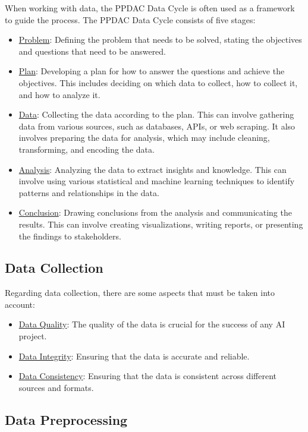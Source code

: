 When working with data, the PPDAC Data Cycle is often used as a framework to guide the process. The PPDAC Data Cycle consists of five stages:
\begin{itemize}
    \item \ul{Problem}: Defining the problem that needs to be solved, stating the objectives and questions that need to be answered.
    \item \ul{Plan}: Developing a plan for how to answer the questions and achieve the objectives. This includes deciding on which data to collect, how to collect it, and how to analyze it.
    \item \ul{Data}: Collecting the data according to the plan. This can involve gathering data from various sources, such as databases, APIs, or web scraping. It also involves preparing the data for analysis, which may include cleaning, transforming, and encoding the data.
    \item \ul{Analysis}: Analyzing the data to extract insights and knowledge. This can involve using various statistical and machine learning techniques to identify patterns and relationships in the data.
    \item \ul{Conclusion}: Drawing conclusions from the analysis and communicating the results. This can involve creating visualizations, writing reports, or presenting the findings to stakeholders.
\end{itemize}

\subsection{Data Collection}
    

Regarding data collection, there are some aspects that must be taken into account:
\begin{itemize}
    \item \ul{Data Quality}: The quality of the data is crucial for the success of any AI project.
    \item \ul{Data Integrity}: Ensuring that the data is accurate and reliable.
    \item \ul{Data Consistency}: Ensuring that the data is consistent across different sources and formats.
\end{itemize}

\subsection{Data Preprocessing}


